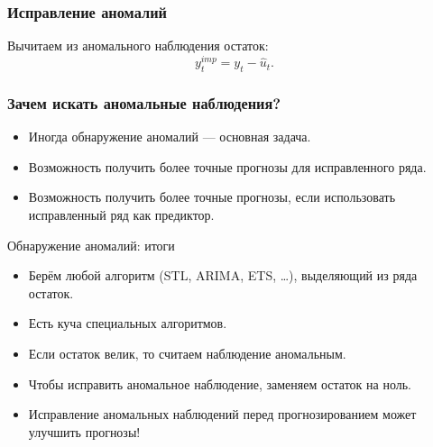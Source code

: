 \begin{frame}
  \frametitle{Исправление аномалий}

  \pause
  Вычитаем из аномального наблюдения остаток:
  \[
  y_t^{imp} = y_t  - \hat u_t.  
  \]

\end{frame}



\begin{frame}
  \frametitle{Зачем искать аномальные наблюдения?}

  \begin{itemize}[<+->]
    \item Иногда обнаружение аномалий — \alert{основная задача}. 
    \item Возможность получить \alert{более точные} прогнозы для исправленного ряда.
    \item Возможность получить \alert{более точные} прогнозы, если использовать исправленный ряд как предиктор.
  \end{itemize}
  

\end{frame}



\begin{frame}{Обнаружение аномалий: итоги}

  \begin{itemize}[<+->]
    \item Берём любой алгоритм (STL, ARIMA, ETS, \ldots), выделяющий из ряда \alert{остаток}.
    \item Есть \alert{куча} специальных алгоритмов.
    \item Если остаток \alert{велик}, то считаем наблюдение аномальным. 
    \item Чтобы исправить аномальное наблюдение, заменяем остаток \alert{на ноль}.
    \item \alert{Исправление} аномальных наблюдений перед прогнозированием может улучшить прогнозы!
  \end{itemize}
\end{frame}

